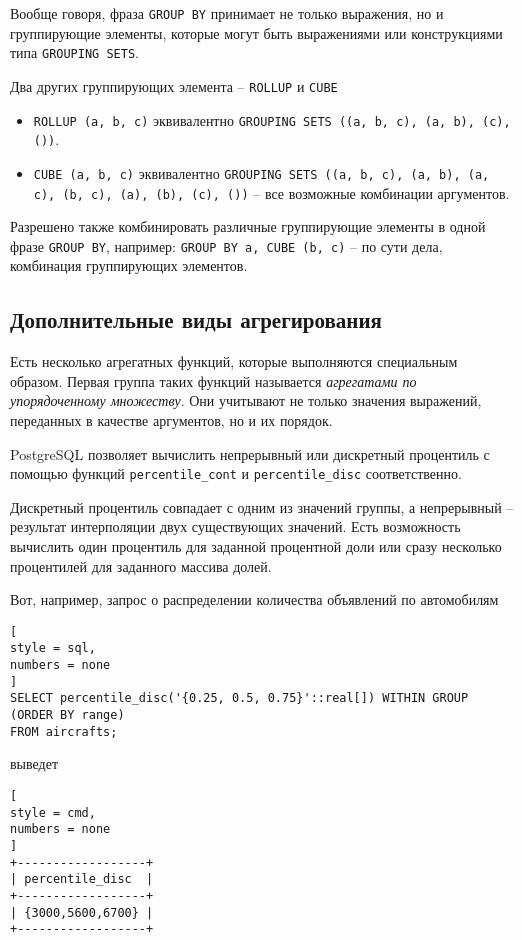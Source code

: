 \documentclass[%
	11pt,
	a4paper,
	utf8,
		]{article}
\begin{document}
Вообще говоря, фраза \texttt{GROUP BY} принимает не только выражения, но и группирующие элементы, которые могут быть выражениями или конструкциями типа \texttt{GROUPING SETS}.

Два других группирующих элемента -- \texttt{ROLLUP} и \texttt{CUBE}
\begin{itemize}
	\item \texttt{ROLLUP (a, b, c)} эквивалентно \texttt{GROUPING SETS ((a, b, c), (a, b), (c), ())}.
	
	\item \texttt{CUBE (a, b, c)} эквивалентно \texttt{GROUPING SETS ((a, b, c), (a, b), (a, c), (b, c), (a), (b), (c), ())} -- все возможные комбинации аргументов.
\end{itemize}

Разрешено также комбинировать различные группирующие элементы в одной фразе \texttt{GROUP BY}, например: \texttt{GROUP BY a, CUBE (b, c)} -- по сути дела, комбинация группирующих элементов.

\subsection{Дополнительные виды агрегирования}

Есть несколько агрегатных функций, которые выполняются специальным образом. Первая группа таких функций называется \textit{агрегатами по упорядоченному множеству}. Они учитывают не только значения выражений, переданных в качестве аргументов, но и их порядок.

PostgreSQL позволяет вычислить непрерывный или дискретный процентиль с помощью функций \texttt{percentile\_cont} и \texttt{percentile\_disc} соответственно.

Дискретный процентиль совпадает с одним из значений группы, а непрерывный -- результат интерполяции двух существующих значений. Есть возможность вычислить один процентиль для заданной процентной доли или сразу несколько процентилей для заданного массива долей.

Вот, например, запрос о распределении количества объявлений по автомобилям
\begin{lstlisting}[
style = sql,
numbers = none
]
SELECT percentile_disc('{0.25, 0.5, 0.75}'::real[]) WITHIN GROUP (ORDER BY range)
FROM aircrafts;
\end{lstlisting}
выведет
\begin{lstlisting}[
style = cmd,
numbers = none
]
+------------------+
| percentile_disc  |
+------------------+
| {3000,5600,6700} |
+------------------+
\end{lstlisting}
\end{document}
